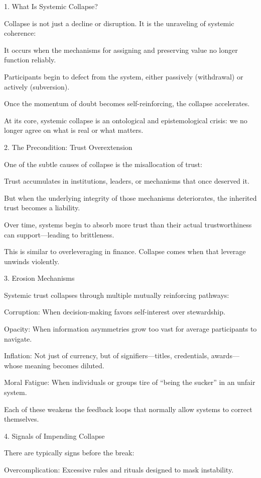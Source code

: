 \documentclass[11pt,oneside]{book}
\begin{document}
1. What Is Systemic Collapse?


Collapse is not just a decline or disruption. It is the unraveling of systemic coherence:

    It occurs when the mechanisms for assigning and preserving value no longer function reliably.

    Participants begin to defect from the system, either passively (withdrawal) or actively (subversion).

    Once the momentum of doubt becomes self-reinforcing, the collapse accelerates.

At its core, systemic collapse is an ontological and epistemological crisis: we no longer agree on what is real or what matters.

2. The Precondition: Trust Overextension


One of the subtle causes of collapse is the misallocation of trust:

    Trust accumulates in institutions, leaders, or mechanisms that once deserved it.

    But when the underlying integrity of those mechanisms deteriorates, the inherited trust becomes a liability.

    Over time, systems begin to absorb more trust than their actual trustworthiness can support—leading to brittleness.

This is similar to overleveraging in finance. Collapse comes when that leverage unwinds violently.

3. Erosion Mechanisms


Systemic trust collapses through multiple mutually reinforcing pathways:

    Corruption: When decision-making favors self-interest over stewardship.

    Opacity: When information asymmetries grow too vast for average participants to navigate.

    Inflation: Not just of currency, but of signifiers—titles, credentials, awards—whose meaning becomes diluted.

    Moral Fatigue: When individuals or groups tire of “being the sucker” in an unfair system.

Each of these weakens the feedback loops that normally allow systems to correct themselves.

4. Signals of Impending Collapse


There are typically signs before the break:

    Overcomplication: Excessive rules and rituals designed to mask instability.
\end{document}
